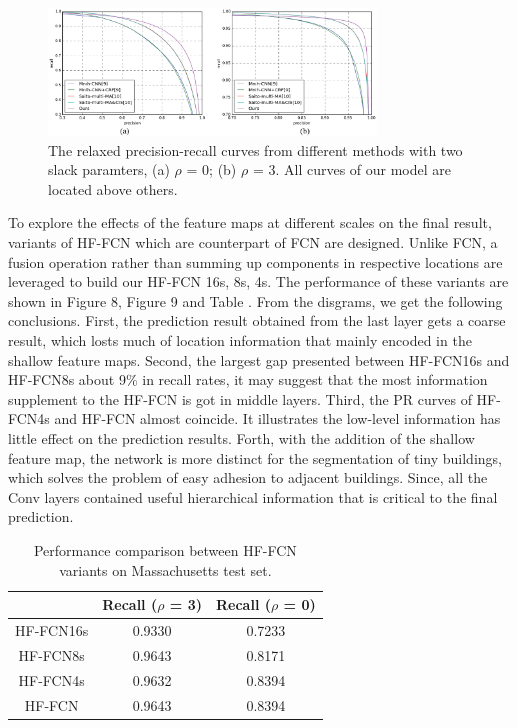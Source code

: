 \begin{figure}
\centering
\includegraphics[width=8.7cm]{Figures/HF-FCN_dataset_a.eps}
\caption{The relaxed precision-recall curves from different methods with two slack paramters, (a) $\rho$ = 0; (b) $\rho$ = 3. All curves of our model are located above others.}
\label{7}
\end{figure}
\setlength{\parindent}{2ex}To explore the effects of the feature maps at different scales on the final result, variants of HF-FCN which are counterpart of FCN are designed. Unlike FCN, a fusion operation rather than summing up components in respective locations are leveraged to build our HF-FCN 16s, 8s, 4s. The performance of these variants are shown in Figure 8, Figure 9 and Table . From the disgrams, we get the following conclusions. First, the prediction result obtained from the last layer gets a coarse result, which losts much of location information that mainly encoded in the shallow feature maps. Second, the largest gap presented between HF-FCN16s and HF-FCN8s about 9{\%} in recall rates, it may suggest that the most information supplement to the HF-FCN is got in middle layers. Third, the PR curves of HF-FCN4s and HF-FCN almost coincide. It illustrates the low-level information has little effect on the prediction results. Forth, with the addition of the shallow feature map, the network is more distinct for the segmentation of tiny buildings, which solves the problem of easy adhesion to adjacent buildings. Since, all the Conv layers contained useful hierarchical information that is critical to the final prediction.\par
\begin{table}
\centering
\caption {Performance comparison between HF-FCN variants on Massachusetts test set.}
\begin{tabular}{ccc}
\hline
&Recall ($\rho$ = 3)&Recall ($\rho$ = 0)\\
\hline
HF-FCN16s&0.9330&0.7233\\
HF-FCN8s&0.9643&0.8171\\
HF-FCN4s&0.9632&0.8394\\
HF-FCN&0.9643&0.8394\\
\hline
\end{tabular}
\end{table}

